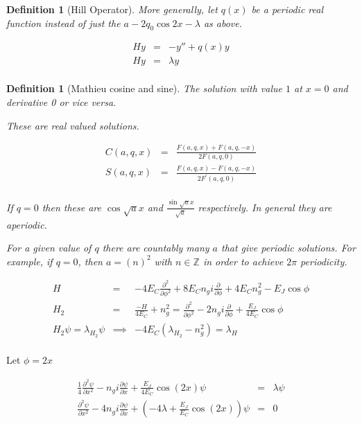 \documentclass[11pt]{article}
\theoremstyle{change}
\newtheorem{definition}[equation]{Definition}
\theoremstyle{nonumberplain}
\numberwithin{equation}{section}
\begin{document}
\begin{definition}[Hill Operator]

More generally, let $q(x)$ be a periodic real function instead of just the $a - 2 q_0 \cos 2x - \lambda$ as above.

\begin{eqnarray*}
H y &=& - y'' + q(x) y\\
H y &=& \lambda y\\
\end{eqnarray*}

\end{definition}

\begin{definition}[Mathieu cosine and sine]
The solution with value $1$ at $x=0$ and derivative 0 or vice versa.

These are real valued solutions.

\begin{eqnarray*}
C(a,q,x) &=& \frac{F(a,q,x)+F(a,q,-x)}{2 F(a,q,0)}\\
S(a,q,x) &=& \frac{F(a,q,x)-F(a,q,-x)}{2 F^{'} (a,q,0) }\\
\end{eqnarray*}

If $q=0$ then these are $\cos \sqrt{a} x$ and $\frac{\sin \sqrt{a} x}{\sqrt{a}}$ respectively. In general they are aperiodic.

For a given value of $q$ there are countably many $a$ that give periodic solutions. For example, if $q=0$, then $a = (n)^2$ with $n \in \mathbb{Z}$ in order to achieve $2 \pi$ periodicity.

\end{definition}

\begin{eqnarray*}
H &=& -4 E_C \frac{\partial^2}{\partial \phi^2} + 8E_C n_g i \frac{\partial}{\partial \phi} + 4E_C n_g^2 - E_J \cos \phi\\
H_2 &=& \frac{-H}{4 E_C} + n_g^2 = \frac{\partial^2}{\partial \phi^2} - 2 n_g i \frac{\partial}{\partial \phi} + \frac{E_J}{4E_C}\cos \phi\\
H_2 \psi = \lambda_{H_2} \psi  &\implies& -4 E_C (\lambda_{H_2} -n_g^2) = \lambda_{H}\\
\end{eqnarray*}

Let $\phi = 2x$

\begin{eqnarray*}
\frac{1}{4} \frac{\partial^2 \psi }{\partial x^2} - n_g i \frac{\partial \psi}{\partial x} + \frac{E_J}{4E_C}\cos (2x) \psi &=& \lambda \psi\\
\frac{\partial^2 \psi }{\partial x^2} - 4 n_g i \frac{\partial \psi}{\partial x} + (-4\lambda+\frac{E_J}{E_C}\cos (2x)) \psi &=& 0\\
\end{eqnarray*}
\end{document}
